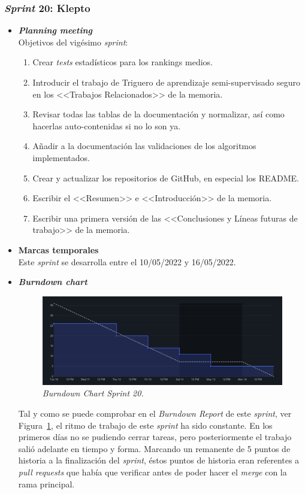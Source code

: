\subsubsection{\textit{Sprint} 20: Klepto}
\begin{itemize}
\item \textbf{\textit{Planning meeting}}\\
Objetivos del vigésimo \textit{sprint}:
\begin{enumerate}
\item Crear \textit{tests} estadísticos para los rankings medios.
\item Introducir el trabajo de Triguero de aprendizaje semi-supervisado seguro~\cite{triguero2014characterization} en los <<Trabajos Relacionados>> de la memoria.
\item Revisar todas las tablas de la documentación y normalizar, así como hacerlas auto-contenidas si no lo son ya.
\item Añadir a la documentación las validaciones de los algoritmos implementados.
\item Crear y actualizar los repositorios de GitHub, en especial los README.
\item Escribir el <<Resumen>> e <<Introducción>> de la memoria.
\item Escribir una primera versión de las <<Conclusiones y Líneas futuras de trabajo>> de la memoria.
\end{enumerate}

\item \textbf{Marcas temporales}\\
Este \textit{sprint} se desarrolla entre el 10/05/2022 y 16/05/2022.

\item \textbf{\textit{Burndown chart}}\\
\begin{figure}
\begin{center}
\includegraphics[width=\textwidth]{../img/anexos/sprints/BD-Sprint20}
\caption{\textit{Burndown Chart Sprint 20.}}\label{fig:BD-Sprint20}
\end{center}
\end{figure}
Tal y como se puede comprobar en el \textit{Burndown Report} de este \textit{sprint}, ver Figura~\ref{fig:BD-Sprint20}, el ritmo de trabajo de este \textit{sprint} ha sido constante. En los primeros días no se pudiendo cerrar tareas, pero posteriormente el trabajo salió adelante en tiempo y forma. Marcando un remanente de 5 puntos de historia a la finalización del \textit{sprint}, éstos puntos de historia eran referentes a \textit{pull requests} que había que verificar antes de poder hacer el \textit{merge} con la rama principal.


\end{itemize}
